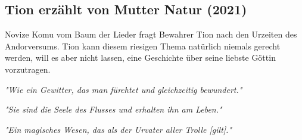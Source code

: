 \begin{chapterbox}
    \chapter{Tion erzählt von Mutter Natur (2021)}
    \label{2021-tion-erzaehlt-von-mutter-natur}
    Novize Komu vom Baum der Lieder fragt Bewahrer Tion nach den Urzeiten des Andorversums. Tion kann diesem riesigen Thema natürlich niemals gerecht werden, will es aber nicht lassen, eine Geschichte über seine liebste Göttin vorzutragen.

\end{chapterbox}








\newpage
{}

\textit{"Wie ein Gewitter, das man fürchtet und gleichzeitig bewundert."}

\trennzeichen

\textit{"Sie sind die Seele des Flusses und erhalten ihn am Leben."}

\trennzeichen

\textit{"Ein magisches Wesen, das als der Urvater aller Trolle [gilt]."}

